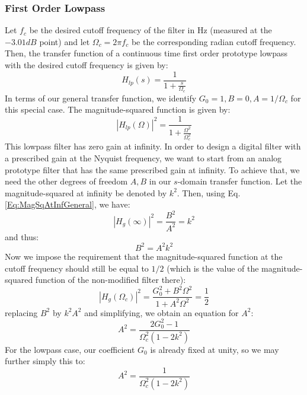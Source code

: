 \subsubsection{First Order Lowpass}
Let $f_c$ be the desired cutoff frequency of the filter in Hz (measured at the $-3.01 dB$ point) and let $\Omega_c = 2 \pi f_c$ be the corresponding radian cutoff frequency. Then, the transfer function of a continuous time first order prototype lowpass with the desired cutoff frequency is given by:
\begin{equation}
 H_{lp}(s) = \frac{1}{1 + \frac{s}{\Omega_c} }
\end{equation}
In terms of our general transfer function, we identify $G_0 = 1, B = 0, A = 1/\Omega_c$ for this special case. The magnitude-squared function is given by:
\begin{equation}
 \label{Eq:MagSqAtInfLowpass}
 |H_{lp}(\Omega)|^2 = \frac{1}{1 + \frac{\Omega^2}{\Omega_c^2} }
\end{equation}
This lowpass filter has zero gain at infinity. In order to design a digital filter with a prescribed gain at the Nyquist frequency, we want to start from an analog prototype filter that has the same prescribed gain at infinity. To achieve that, we need the other degrees of freedom $A, B$ in our $s$-domain transfer function. Let the magnitude-squared at infinity be denoted by $k^2$. Then, using Eq. \ref{Eq:MagSqAtInfGeneral}, we have:
\begin{equation}
 |H_g(\infty)|^2 = \frac{B^2}{A^2} = k^2
\end{equation}
and thus:
\begin{equation}
 B^2 = A^2 k^2
\end{equation}
Now we impose the requirement that the magnitude-squared function at the cutoff frequency should still be equal to $1/2$ (which is the value of the magnitude-squared function of the non-modified filter there):
\begin{equation}
 |H_g(\Omega_c)|^2 = \frac{G_0^2 + B^2 \Omega^2}{1 + A^2 \Omega^2} = \frac{1}{2}
\end{equation}
replacing $B^2$ by $k^2 A^2$ and simplifying, we obtain an equation for $A^2$:
\begin{equation}
 A^2 = \frac{2 G_0^2 - 1}{\Omega_c^2(1-2 k^2)}
\end{equation}
For the lowpass case, our coefficient $G_0$ is already fixed at unity, so we may further simply this to:
\begin{equation}
 A^2 = \frac{1}{\Omega_c^2(1-2 k^2)}
\end{equation}
